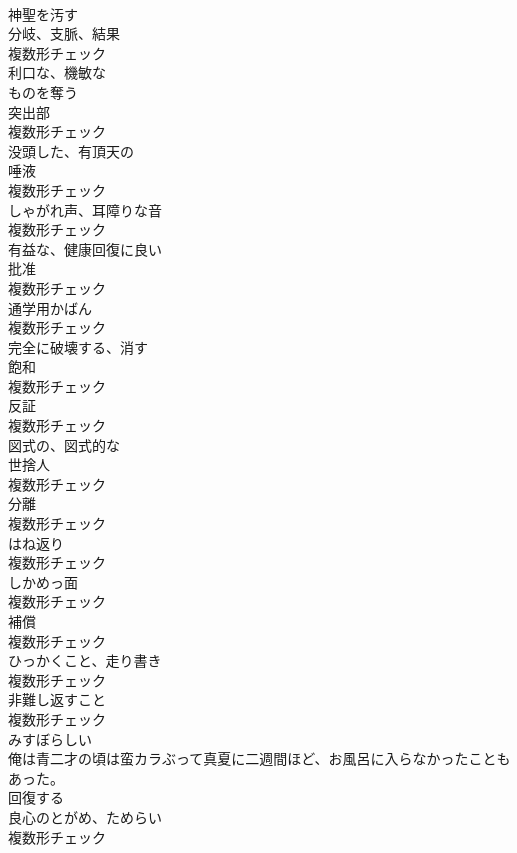 \documentclass[8pt]{extreport}
\begin{document}
\begin{CJK}{UTF8}{min}
\\	[形容詞]	神聖を汚す	
\\	[名詞]	分岐、支脈、結果	
\\	複数形チェック
\\	[形容詞]	利口な、機敏な	
\\	[動詞]	ものを奪う	
\\	[名詞]	突出部	
\\	複数形チェック
\\	[形容詞]	没頭した、有頂天の	
\\	[名詞]	唾液	
\\	複数形チェック
\\	[名詞]	しゃがれ声、耳障りな音	
\\	複数形チェック
\\	[形容詞]	有益な、健康回復に良い	
\\	[名詞]	批准	
\\	複数形チェック
\\	[名詞]	通学用かばん	
\\	複数形チェック
\\	[動詞]	完全に破壊する、消す	
\\	[名詞]	飽和	
\\	複数形チェック
\\	[名詞]	反証	
\\	複数形チェック
\\	[形容詞]	図式の、図式的な	
\\	[名詞]	世捨人	
\\	複数形チェック
\\	[名詞]	分離	
\\	複数形チェック
\\	[名詞]	はね返り	
\\	複数形チェック
\\	[名詞]	しかめっ面	
\\	複数形チェック
\\	[名詞]	補償	
\\	複数形チェック
\\	[名詞]	ひっかくこと、走り書き	
\\	複数形チェック
\\	[名詞]	非難し返すこと	
\\	複数形チェック
\\	[形容詞]	みすぼらしい	
\\	俺は青二才の頃は蛮カラぶって真夏に二週間ほど、お風呂に入らなかったこともあった。	
\\	[動詞]	回復する	
\\	[名詞]	良心のとがめ、ためらい	
\\	複数形チェック

\end{CJK}
\end{document}
